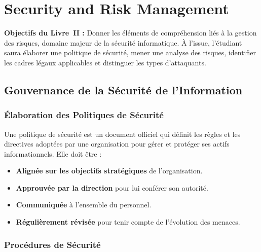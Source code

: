 
\chapter{Security and Risk Management}
\label{chap:risk_management}

\begin{boxobjectifs}
\textbf{Objectifs du Livre~II :} Donner les éléments de compréhension liés à la gestion des risques, domaine majeur de la sécurité informatique. À l'issue, l'étudiant saura élaborer une politique de sécurité, mener une analyse des risques, identifier les cadres légaux applicables et distinguer les types d'attaquants.
\end{boxobjectifs}

\section{Gouvernance de la Sécurité de l'Information}

\subsection{Élaboration des Politiques de Sécurité}

Une politique de sécurité est un document officiel qui définit les règles et les directives adoptées par une organisation pour gérer et protéger ses actifs informationnels. Elle doit être :

\begin{itemize}
    \item \textbf{Alignée sur les objectifs stratégiques} de l'organisation.
    \item \textbf{Approuvée par la direction} pour lui conférer son autorité.
    \item \textbf{Communiquée} à l'ensemble du personnel.
    \item \textbf{Régulièrement révisée} pour tenir compte de l'évolution des menaces.
\end{itemize}

\subsection{Procédures de Sécurité}

